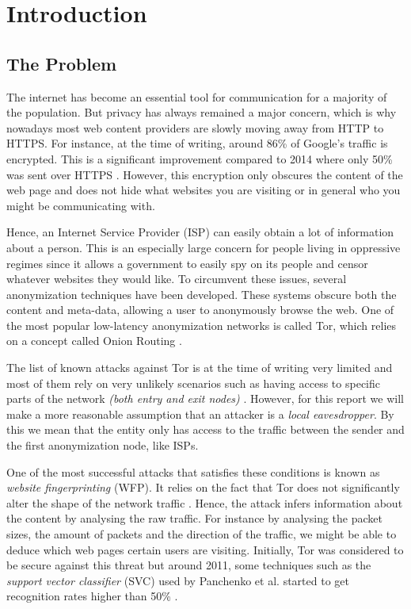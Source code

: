 \chapter{Introduction}

\section{The Problem}

The internet has become an essential tool for communication for a majority of the population. But privacy has always remained a major concern,
which is why nowadays most web content providers are slowly moving away from HTTP to HTTPS.
For instance, at the time of writing, around 86\% of Google’s traffic is encrypted. This is a significant improvement compared to 2014 where only 50\%
was sent over HTTPS \cite{google_transparancy}. However, this encryption only obscures the content of the web page and does not
hide what websites you are visiting or in general who you might be communicating with.

Hence, an Internet Service Provider (ISP) can easily obtain a lot of information about a person.
This is an especially large concern for people living in oppressive regimes since it allows a government to easily spy on its people and
censor whatever websites they would like. To circumvent these issues, several anonymization techniques have been developed.
These systems obscure both the content and meta-data, allowing a user to anonymously browse the web. One of the most popular low-latency anonymization
networks is called Tor, which relies on a concept called Onion Routing \cite{tor_project}.

The list of known attacks against Tor is at the time of writing very limited and most of them rely on very
unlikely scenarios such as having access to specific parts of the network \textit{(both entry and exit nodes)} \cite{tor_project}.
However, for this report we will make a more reasonable assumption that an attacker is a \textit{local eavesdropper}.
By this we mean that the entity only has access to the traffic between the sender and the first anonymization node, like ISPs.

One of the most successful attacks that satisfies these conditions is known as \textit{website fingerprinting} (WFP).
It relies on the fact that Tor does not significantly alter the shape of the network traffic \cite{kfingerprinting}.
Hence, the attack infers information about the content by analysing the raw traffic.
For instance by analysing the packet sizes, the amount of packets and the direction of the traffic, we might be able to deduce
which web pages certain users are visiting.
Initially, Tor was considered to be secure against this threat but around 2011, some techniques such as the \textit{support vector classifier} (SVC)
used by Panchenko et al. started to get recognition rates higher than 50\% \cite{panchenko1}.

